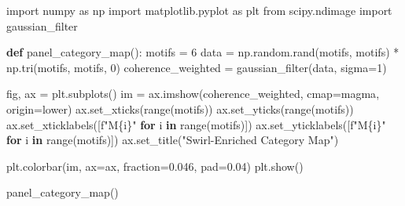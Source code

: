 \documentclass[
  11pt,
]{article}
\newenvironment{Shaded}{\begin{snugshade}}{\end{snugshade}}
\newcommand{\BuiltInTok}[1]{\textcolor[rgb]{0.00,0.23,0.31}{#1}}
\newcommand{\ControlFlowTok}[1]{\textcolor[rgb]{0.00,0.23,0.31}{\textbf{#1}}}
\newcommand{\DecValTok}[1]{\textcolor[rgb]{0.68,0.00,0.00}{#1}}
\newcommand{\FloatTok}[1]{\textcolor[rgb]{0.68,0.00,0.00}{#1}}
\newcommand{\ImportTok}[1]{\textcolor[rgb]{0.00,0.46,0.62}{#1}}
\newcommand{\KeywordTok}[1]{\textcolor[rgb]{0.00,0.23,0.31}{\textbf{#1}}}
\newcommand{\NormalTok}[1]{\textcolor[rgb]{0.00,0.23,0.31}{#1}}
\newcommand{\OperatorTok}[1]{\textcolor[rgb]{0.37,0.37,0.37}{#1}}
\newcommand{\SpecialCharTok}[1]{\textcolor[rgb]{0.37,0.37,0.37}{#1}}
\newcommand{\SpecialStringTok}[1]{\textcolor[rgb]{0.13,0.47,0.30}{#1}}
\newcommand{\StringTok}[1]{\textcolor[rgb]{0.13,0.47,0.30}{#1}}
\begin{document}
\begin{Shaded}
\begin{Highlighting}[]
\ImportTok{import}\NormalTok{ numpy }\ImportTok{as}\NormalTok{ np}
\ImportTok{import}\NormalTok{ matplotlib.pyplot }\ImportTok{as}\NormalTok{ plt}
\ImportTok{from}\NormalTok{ scipy.ndimage }\ImportTok{import}\NormalTok{ gaussian\_filter}

\KeywordTok{def}\NormalTok{ panel\_category\_map():}
\NormalTok{    motifs }\OperatorTok{=} \DecValTok{6}
\NormalTok{    data }\OperatorTok{=}\NormalTok{ np.random.rand(motifs, motifs) }\OperatorTok{*}\NormalTok{ np.tri(motifs, motifs, }\DecValTok{0}\NormalTok{)}
\NormalTok{    coherence\_weighted }\OperatorTok{=}\NormalTok{ gaussian\_filter(data, sigma}\OperatorTok{=}\DecValTok{1}\NormalTok{)}
    
\NormalTok{    fig, ax }\OperatorTok{=}\NormalTok{ plt.subplots()}
\NormalTok{    im }\OperatorTok{=}\NormalTok{ ax.imshow(coherence\_weighted, cmap}\OperatorTok{=}\StringTok{\textquotesingle{}magma\textquotesingle{}}\NormalTok{, origin}\OperatorTok{=}\StringTok{\textquotesingle{}lower\textquotesingle{}}\NormalTok{)}
\NormalTok{    ax.set\_xticks(}\BuiltInTok{range}\NormalTok{(motifs))}
\NormalTok{    ax.set\_yticks(}\BuiltInTok{range}\NormalTok{(motifs))}
\NormalTok{    ax.set\_xticklabels([}\SpecialStringTok{f"M}\SpecialCharTok{\{}\NormalTok{i}\SpecialCharTok{\}}\SpecialStringTok{"} \ControlFlowTok{for}\NormalTok{ i }\KeywordTok{in} \BuiltInTok{range}\NormalTok{(motifs)])}
\NormalTok{    ax.set\_yticklabels([}\SpecialStringTok{f"M}\SpecialCharTok{\{}\NormalTok{i}\SpecialCharTok{\}}\SpecialStringTok{"} \ControlFlowTok{for}\NormalTok{ i }\KeywordTok{in} \BuiltInTok{range}\NormalTok{(motifs)])}
\NormalTok{    ax.set\_title(}\StringTok{"Swirl{-}Enriched Category Map"}\NormalTok{)}
    
\NormalTok{    plt.colorbar(im, ax}\OperatorTok{=}\NormalTok{ax, fraction}\OperatorTok{=}\FloatTok{0.046}\NormalTok{, pad}\OperatorTok{=}\FloatTok{0.04}\NormalTok{)}
\NormalTok{    plt.show()}

\NormalTok{panel\_category\_map()}
\end{Highlighting}
\end{Shaded}
\end{document}
